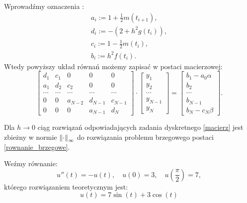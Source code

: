 \documentclass[notheorems]{beamer}
\begin{document}
\begin{frame}
\begin{small}
Wprowadźmy oznaczenia :
\begin{align*}
a_i:= 1 + \frac{1}{2}m(t_{i+1}),\\
d_i:= -(2+h^2 g(t_i)), \\
c_i:= 1 - \frac{1}{2}m(t_i), \\
b_i:= h^2 f(t_i).
\end{align*}
Wtedy powyższy układ równań możemy zapisać w postaci macierzowej:
\begin{equation}\label{macierz}
\left[ \begin{array}{ccccc}
d_1 & c_1 & 0 & 0 & 0 \\
a_1 & d_2 & c_2 & 0 & 0\\
\cdots & \cdots & \cdots &\cdots  &\cdots \\
0 & 0 & a_{N-2} & d_{N-1} & c_{N-1}\\
0 & 0 & 0 & a_{N-1} & d_N 
\end{array} \right] \cdot
\left[ \begin{array}{c}
y_1 \\
y_2 \\
\cdots \\
y_{N-1} \\
y_{N}  
\end{array} \right] =
\left[ \begin{array}{c}
b_1 - a_0\alpha\\
b_2 \\
\cdots \\
b_{N-1} \\
b_N -c_N\beta 
\end{array} \right] .
\end{equation}
\end{small}
\end{frame}
\begin{frame}
\begin{theorem}
Dla $h \to 0$ ciąg rozwiązań odpowiadających zadania dyskretnego \eqref{macierz} jest zbieżny w normie $\norm[\infty]{\cdot}$ do rozwiązania problemu brzegowego postaci \eqref{rownanie_brzegowe}.
\end{theorem}
\end{frame}
\begin{frame}
\begin{example}
Weźmy równanie:
$$
u''(t)= -u(t), \quad u(0)=3, \quad u(\frac{\pi}{2}) = 7,
$$
którego rozwiązaniem teoretycznym jest:
$$
u(t) = 7\sin(t) + 3\cos(t)
$$
\end{example}
\end{frame}
\end{document}
